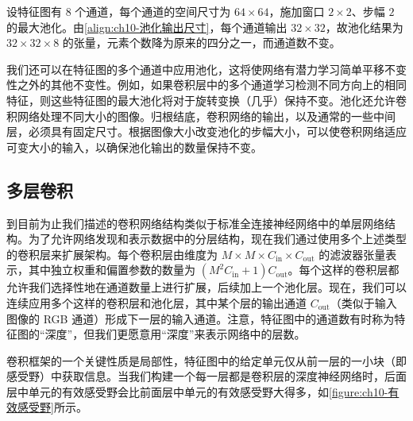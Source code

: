 \documentclass[../../main.tex]{subfiles}
\begin{document}
\begin{example}[ $8$ 通道特征图的最大池化]\label{example:ch10-池化示例}
设特征图有 $8$ 个通道，每个通道的空间尺寸为 $64\times 64$，施加窗口 $2\times 2$、步幅 $2$ 的最大池化。由\eqref{align:ch10-池化输出尺寸}，每个通道输出 $32\times 32$，故池化结果为 $32\times 32\times 8$ 的张量，元素个数降为原来的四分之一，而通道数不变。
\end{example}

我们还可以在特征图的多个通道中应用池化，这将使网络有潜力学习简单平移不变性之外的其他不变性。例如，如果卷积层中的多个通道学习检测不同方向上的相同特征，则这些特征图的最大池化将对于旋转变换（几乎）保持不变。池化还允许卷积网络处理不同大小的图像。归根结底，卷积网络的输出，以及通常的一些中间层，必须具有固定尺寸。根据图像大小改变池化的步幅大小，可以使卷积网络适应可变大小的输入，以确保池化输出的数量保持不变。

\subsection{多层卷积}\label{subsection:ch10-多层卷积}

到目前为止我们描述的卷积网络结构类似于标准全连接神经网络中的单层网络结构。为了允许网络发现和表示数据中的分层结构，现在我们通过使用多个上述类型的卷积层来扩展架构。每个卷积层由维度为 $M\times M\times C_{\mathrm{in}}\times C_{\mathrm{out}}$ 的滤波器张量表示，其中独立权重和偏置参数的数量为 $(M^2C_{\mathrm{in}}+1)C_{\mathrm{out}}$。每个这样的卷积层都允许我们选择性地在通道数量上进行扩展，后续加上一个池化层。现在，我们可以连续应用多个这样的卷积层和池化层，其中某个层的输出通道 $C_{\mathrm{out}}$（类似于输入图像的 RGB 通道）形成下一层的输入通道。注意，特征图中的通道数有时称为特征图的“深度”，但我们更愿意用“深度”来表示网络中的层数。

卷积框架的一个关键性质是局部性，特征图中的给定单元仅从前一层的一小块（即感受野）中获取信息。当我们构建一个每一层都是卷积层的深度神经网络时，后面层中单元的有效感受野会比前面层中单元的有效感受野大得多，如\cref{figure:ch10-有效感受野}所示。
\end{document}
